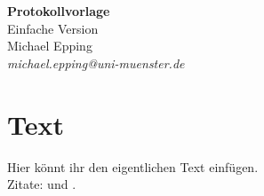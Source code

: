 \documentclass[
    bibtotocnumbered,                                      %
    a4paper,                                               %
    oneside,                                               %
    12pt,                                                  %
    pagesize=auto                                          %
]{scrartcl}
\begin{document}

\setcounter{page}{1}


\begin{titlepage}
    \vspace*{4cm}
    \begin{center}
        \Huge
        \textbf{Protokollvorlage}\\
        \vspace{1cm}
        \large
        Einfache Version \\
        \vspace{5cm}
        Michael Epping \\  
        \vspace{1cm}
        \normalsize      
        \textit{michael.epping@uni-muenster.de} \\ 
    \end{center}
\end{titlepage}


\tableofcontents
\newpage

\setcounter{page}{1}


\section{Text}

Hier könnt ihr den eigentlichen Text einfügen. \\
Zitate: \cite{anleitung2012} und \cite{anleitung2013}.


\end{document}
